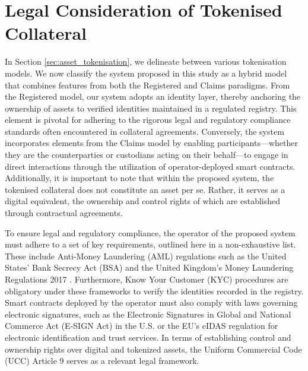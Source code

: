 \section{Legal Consideration of Tokenised Collateral}
\label{sec:legal_considerations}
In Section \ref{sec:asset_tokenisation}, we delineate between various tokenisation models. We now classify the system proposed in this study as a hybrid model that combines features from both the Registered and Claims paradigms. From the Registered model, our system adopts an identity layer, thereby anchoring the ownership of assets to verified identities maintained in a regulated registry. This element is pivotal for adhering to the rigorous legal and regulatory compliance standards often encountered in collateral agreements. Conversely, the system incorporates elements from the Claims model by enabling participants—whether they are the counterparties or custodians acting on their behalf—to engage in direct interactions through the utilization of operator-deployed smart contracts. Additionally, it is important to note that within the proposed system, the tokenised collateral does not constitute an asset per se. Rather, it serves as a digital equivalent, the ownership and control rights of which are established through contractual agreements.

To ensure legal and regulatory compliance, the operator of the proposed system must adhere to a set of key requirements, outlined here in a non-exhaustive list. These include Anti-Money Laundering (AML) regulations such as the United States' Bank Secrecy Act (BSA) \citep{BSA} and the United Kingdom's Money Laundering Regulations 2017 \citep{uk_aml}. Furthermore, Know Your Customer (KYC) procedures are obligatory under these frameworks to verify the identities recorded in the registry. Smart contracts deployed by the operator must also comply with laws governing electronic signatures, such as the Electronic Signatures in Global and National Commerce Act (E-SIGN Act) \citep{e-SIGN} in the U.S. or the EU's eIDAS regulation \citep{eIDAS} for electronic identification and trust services. In terms of establishing control and ownership rights over digital and tokenized assets, the Uniform Commercial Code (UCC) Article 9 \citep{ucc_9} serves as a relevant legal framework.